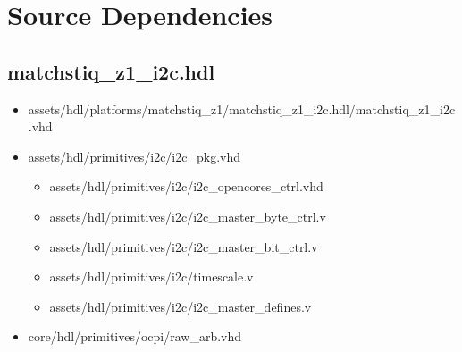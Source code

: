 \documentclass{article}
\def\comp{matchstiq\_z1\_i2c}
\begin{document}
\section*{Source Dependencies}
\subsection*{\comp.hdl}
\begin{itemize}
	\item assets/hdl/platforms/matchstiq\_z1/\comp.hdl/\comp.vhd
	\item assets/hdl/primitives/i2c/i2c\_pkg.vhd
	      \begin{itemize}
	      	\item assets/hdl/primitives/i2c/i2c\_opencores\_ctrl.vhd
	      	\item assets/hdl/primitives/i2c/i2c\_master\_byte\_ctrl.v
	      	\item assets/hdl/primitives/i2c/i2c\_master\_bit\_ctrl.v
	      	\item assets/hdl/primitives/i2c/timescale.v
	      	\item assets/hdl/primitives/i2c/i2c\_master\_defines.v
	      \end{itemize}
	\item core/hdl/primitives/ocpi/raw\_arb.vhd
\end{itemize}
\end{document}

